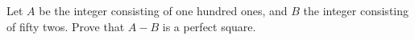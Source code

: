 Let $A$ be the integer consisting of one hundred ones, and $B$ the integer consisting of fifty twos. Prove that $A-B$ is a perfect square.
